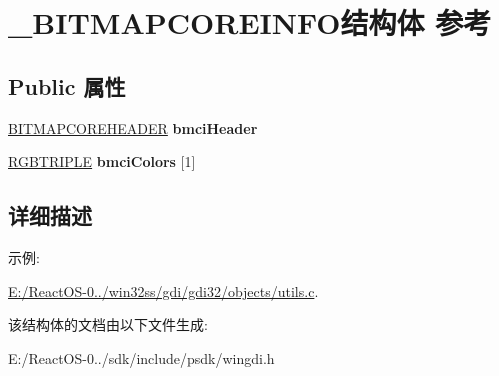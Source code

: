 \hypertarget{struct___b_i_t_m_a_p_c_o_r_e_i_n_f_o}{}\section{\+\_\+\+B\+I\+T\+M\+A\+P\+C\+O\+R\+E\+I\+N\+F\+O结构体 参考}
\label{struct___b_i_t_m_a_p_c_o_r_e_i_n_f_o}
\subsection*{Public 属性}
\begin{DoxyCompactItemize}
\item 
\mbox{\label{struct___b_i_t_m_a_p_c_o_r_e_i_n_f_o_a42d3554be9992865a30f6a78f6fb28e8}} 
\hyperlink{structtag_b_i_t_m_a_p_c_o_r_e_h_e_a_d_e_r}{B\+I\+T\+M\+A\+P\+C\+O\+R\+E\+H\+E\+A\+D\+ER} {\bfseries bmci\+Header}
\item 
\mbox{\label{struct___b_i_t_m_a_p_c_o_r_e_i_n_f_o_a92ba5476ab1f51dbbf90f3e1a4f83644}} 
\hyperlink{structtag_r_g_b_t_r_i_p_l_e}{R\+G\+B\+T\+R\+I\+P\+LE} {\bfseries bmci\+Colors} \mbox{[}1\mbox{]}
\end{DoxyCompactItemize}


\subsection{详细描述}
\begin{Desc}
\item[示例\+: ]\par
\hyperlink{_e_1_2_react_o_s-0_84_86_2win32ss_2gdi_2gdi32_2objects_2utils_8c-example}{E\+:/\+React\+O\+S-\/0../win32ss/gdi/gdi32/objects/utils.\+c}.\end{Desc}


该结构体的文档由以下文件生成\+:\begin{DoxyCompactItemize}
\item 
E\+:/\+React\+O\+S-\/0../sdk/include/psdk/wingdi.\+h\end{DoxyCompactItemize}
